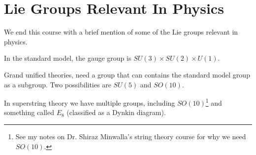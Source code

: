 \section{Lie Groups Relevant In Physics}

We end this course with a brief mention of some of the Lie groups relevant in physics.
\ben[label=(\roman*)]
    \item In the standard model, the gauge group is $SU(3)\times SU(2)\times U(1)$. 
    \item Grand unified theories, need a group that can contains the standard model group as a subgroup. Two possibilities are $SU(5)$ and $SO(10)$.
    \item In superstring theory we have multiple groups, including $SO(10)$\footnote{See my notes on Dr. Shiraz Minwalla's string theory course for why we need $SO(10)$.} and something called $E_8$ (classified as a Dynkin diagram).
\een 
